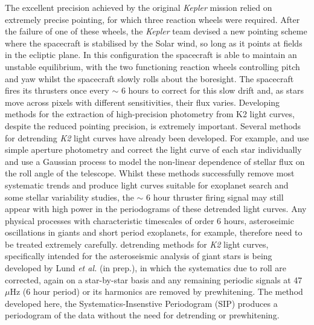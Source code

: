 \documentclass[useAMS, usenatbib, preprint, 12pt]{aastex}
\begin{document}
The excellent precision achieved by the original {\it Kepler} mission relied
on extremely precise pointing, for which three reaction wheels were required.
After the failure of one of these wheels, the {\it Kepler} team devised a new
pointing scheme where the spacecraft is stabilised by the Solar wind, so long
as it points at fields in the ecliptic plane.
In this configuration the spacecraft is able to maintain an unstable
equilibrium, with the two functioning reaction wheels controlling pitch and
yaw whilst the spacecraft slowly rolls about the boresight.
The spacecraft fires its thrusters once every $\sim$ 6 hours to correct for
this slow drift and, as stars move across pixels with different sensitivities,
their flux varies.
Developing methods for the extraction of high-precision photometry from K2
light curves, despite the reduced pointing precision, is extremely
important.
Several methods for detrending {\it K2} light curves have already been
developed.
For example, \citet{Vanderburg2014} and \citet{Crossfield2015} use simple
aperture photometry and correct the light curve of each star individually and
\citet{Aigrain2015} use a Gaussian process to model the non-linear dependence
of stellar flux on the roll angle of the telescope.
Whilst these methods successfully remove most systematic trends and
produce light curves suitable for exoplanet search and some stellar
variability studies, the $\sim$ 6 hour thruster firing signal may still appear
with high power in the periodograms of these detrended light curves.
Any physical processes with characteristic timescales of order
6 hours, asteroseimic oscillations in giants and short period
exoplanets, for example, therefore need to be treated extremely carefully.
 detrending methods for {\it K2} light curves, specifically intended for the
asteroseismic analysis of giant stars is being developed by Lund {\it et al.}
(in prep.), in which the systematics due to roll are corrected, again on
a star-by-star basis and any remaining periodic signals at 47 $\mu$Hz (6 hour
period) or its harmonics are removed by prewhitening.
The method developed here, the Systematics-Insenstive Periodogram (SIP)
produces a periodogram of the data without the need for detrending or
prewhitening.
\end{document}
